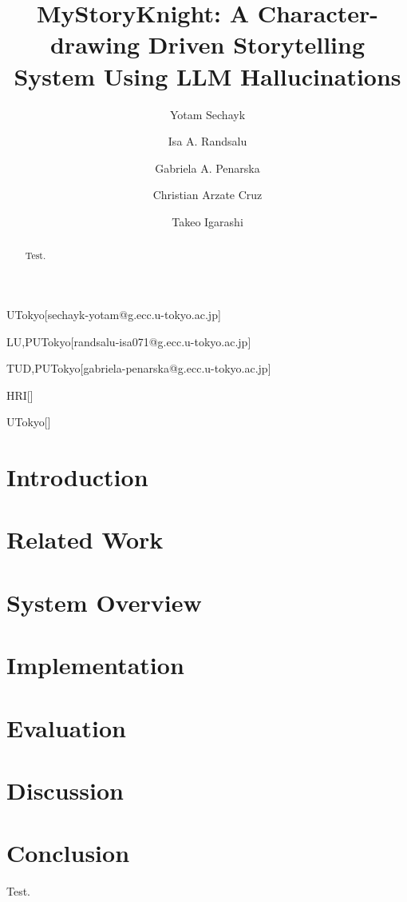 \documentclass[submit,techrep,english]{ipsj}
\begin{document}
\title{MyStoryKnight: A Character-drawing Driven Storytelling System Using LLM Hallucinations}


\author{Yotam Sechayk}{UTokyo}[sechayk-yotam@g.ecc.u-tokyo.ac.jp]
\author{Isa A. Randsalu}{LU,PUTokyo}[randsalu-isa071@g.ecc.u-tokyo.ac.jp]
\author{Gabriela A. Penarska}{TUD,PUTokyo}[gabriela-penarska@g.ecc.u-tokyo.ac.jp]
\author{Christian Arzate Cruz}{HRI}[]
\author{Takeo Igarashi}{UTokyo}[]

\begin{abstract}
    Test.
\end{abstract}

\maketitle

\section{Introduction}

\section{Related Work}

\section{System Overview}

\section{Implementation}

\section{Evaluation}

\section{Discussion}

\section{Conclusion}

\begin{acknowledgment}
    Test.
\end{acknowledgment}




\appendix
\end{document}
